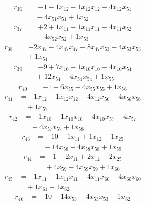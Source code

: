 \[\begin{aligned}
r_{36} &= - 1 - 1 x_{12} - 1 x_{12} x_{12} - 4 x_{12} x_{51} \\
 &\quad - 4 x_{51} x_{51} + 1 x_{52}
\end{aligned}\]
\[\begin{aligned}
r_{37} &= + 2 + 1 x_{11} - 1 x_{11} x_{11} - 4 x_{11} x_{52} \\
 &\quad - 4 x_{52} x_{52} + 1 x_{53}
\end{aligned}\]
\[\begin{aligned}
r_{38} &= - 2 x_{47} - 4 x_{47} x_{47} - 8 x_{47} x_{53} - 4 x_{53} x_{53} \\
 &\quad + 1 x_{54}
\end{aligned}\]
\[\begin{aligned}
r_{39} &= - 9 + 7 x_{10} - 1 x_{10} x_{10} - 4 x_{10} x_{54} \\
 &\quad + 12 x_{54} - 4 x_{54} x_{54} + 1 x_{55}
\end{aligned}\]
\[\begin{aligned}
r_{40} &= - 1 - 6 x_{55} - 4 x_{55} x_{55} + 1 x_{56}
\end{aligned}\]
\[\begin{aligned}
r_{41} &= - 1 x_{12} - 1 x_{12} x_{12} - 4 x_{12} x_{56} - 4 x_{56} x_{56} \\
 &\quad + 1 x_{57}
\end{aligned}\]
\[\begin{aligned}
r_{42} &= - 1 x_{10} - 1 x_{10} x_{10} - 4 x_{10} x_{57} - 4 x_{57} \\
 &\quad - 4 x_{57} x_{57} + 1 x_{58}
\end{aligned}\]
\[\begin{aligned}
r_{43} &= - 10 - 1 x_{11} + 1 x_{12} - 1 x_{25} \\
 &\quad - 14 x_{58} - 4 x_{58} x_{58} + 1 x_{59}
\end{aligned}\]
\[\begin{aligned}
r_{44} &= + 1 - 2 x_{11} + 2 x_{12} - 2 x_{25} \\
 &\quad + 4 x_{59} - 4 x_{59} x_{59} + 1 x_{60}
\end{aligned}\]
\[\begin{aligned}
r_{45} &= + 1 x_{11} - 1 x_{11} x_{11} - 4 x_{11} x_{60} - 4 x_{60} x_{60} \\
 &\quad + 1 x_{61} - 1 x_{62}
\end{aligned}\]
\[\begin{aligned}
r_{46} &= - 10 - 14 x_{53} - 4 x_{53} x_{53} + 1 x_{62}
\end{aligned}\]
